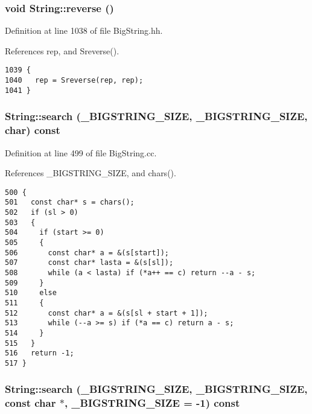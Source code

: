 \subsubsection{\setlength{\rightskip}{0pt plus 5cm}void String::reverse ()\hspace{0.3cm}{\tt  [inline]}}\label{classString_a94}




Definition at line 1038 of file Big\-String.hh.

References rep, and Sreverse().



\footnotesize\begin{verbatim}1039 {
1040   rep = Sreverse(rep, rep);
1041 }
\end{verbatim}\normalsize 
{}
\subsubsection{ String::search ({\bf \_\-BIGSTRING\_\-SIZE}, {\bf \_\-BIGSTRING\_\-SIZE}, char) const\hspace{0.3cm}{\tt  [protected]}}\label{classString_b1}




Definition at line 499 of file Big\-String.cc.

References \_\-BIGSTRING\_\-SIZE, and chars().



\footnotesize\begin{verbatim}500 {
501   const char* s = chars();
502   if (sl > 0)
503   {
504     if (start >= 0)
505     {
506       const char* a = &(s[start]);
507       const char* lasta = &(s[sl]);
508       while (a < lasta) if (*a++ == c) return --a - s;
509     }
510     else
511     {
512       const char* a = &(s[sl + start + 1]);
513       while (--a >= s) if (*a == c) return a - s;
514     }
515   }
516   return -1;
517 }
\end{verbatim}\normalsize 
{}
\subsubsection{ String::search ({\bf \_\-BIGSTRING\_\-SIZE}, {\bf \_\-BIGSTRING\_\-SIZE}, const char $\ast$, {\bf \_\-BIGSTRING\_\-SIZE} = -1) const\hspace{0.3cm}{\tt  [protected]}}\label{classString_b0}




